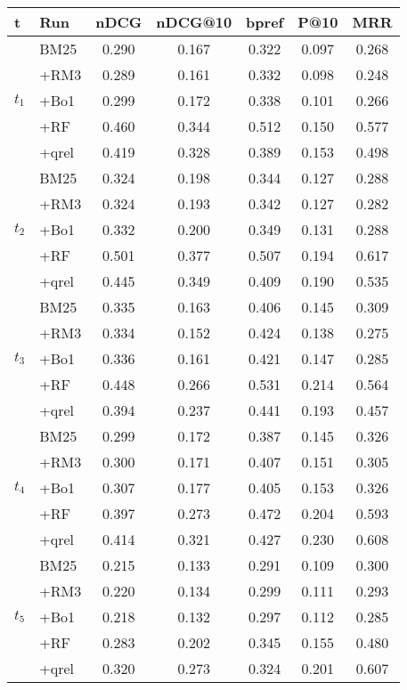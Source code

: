 \begin{tabular}{llccccc}
    \toprule
    t & Run & nDCG & nDCG@10 & bpref & P@10 & MRR \\
    \midrule

     \multirow[c]{5}{*}{$t_1$}  & BM25 & 0.290 & 0.167 & 0.322 & 0.097 & 0.268 \\
& +RM3 & 0.289 & 0.161 & 0.332 & 0.098 & 0.248 \\
& +Bo1 & 0.299 & 0.172 & 0.338 & 0.101 & 0.266 \\
& +RF & 0.460 & 0.344 & 0.512 & 0.150 & 0.577 \\
& +qrel & 0.419 & 0.328 & 0.389 & 0.153 & 0.498 \\\midrule
\multirow[c]{5}{*}{$t_2$}  & BM25 & 0.324 & 0.198 & 0.344 & 0.127 & 0.288 \\
& +RM3 & 0.324 & 0.193 & 0.342 & 0.127 & 0.282 \\
& +Bo1 & 0.332 & 0.200 & 0.349 & 0.131 & 0.288 \\
& +RF & 0.501 & 0.377 & 0.507 & 0.194 & 0.617 \\
& +qrel & 0.445 & 0.349 & 0.409 & 0.190 & 0.535 \\\midrule
\multirow[c]{5}{*}{$t_3$}   & BM25 & 0.335 & 0.163 & 0.406 & 0.145 & 0.309 \\
& +RM3 & 0.334 & 0.152 & 0.424 & 0.138 & 0.275 \\
& +Bo1 & 0.336 & 0.161 & 0.421 & 0.147 & 0.285 \\
& +RF & 0.448 & 0.266 & 0.531 & 0.214 & 0.564 \\
& +qrel & 0.394 & 0.237 & 0.441 & 0.193 & 0.457 \\\midrule
\multirow[c]{5}{*}{$t_4$}   & BM25 & 0.299 & 0.172 & 0.387 & 0.145 & 0.326 \\
& +RM3 & 0.300 & 0.171 & 0.407 & 0.151 & 0.305 \\
& +Bo1 & 0.307 & 0.177 & 0.405 & 0.153 & 0.326 \\
& +RF & 0.397 & 0.273 & 0.472 & 0.204 & 0.593 \\
& +qrel & 0.414 & 0.321 & 0.427 & 0.230 & 0.608 \\\midrule
\multirow[c]{5}{*}{$t_5$}   & BM25 & 0.215 & 0.133 & 0.291 & 0.109 & 0.300 \\
& +RM3 & 0.220 & 0.134 & 0.299 & 0.111 & 0.293 \\
& +Bo1 & 0.218 & 0.132 & 0.297 & 0.112 & 0.285 \\
& +RF & 0.283 & 0.202 & 0.345 & 0.155 & 0.480 \\
& +qrel & 0.320 & 0.273 & 0.324 & 0.201 & 0.607 \\


    \bottomrule
    \end{tabular}
    